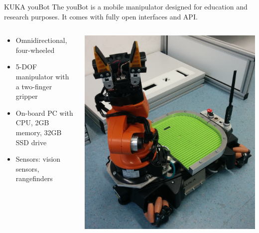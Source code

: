 \begin{frame}{KUKA youBot}
The youBot is a mobile manipulator designed for education and research purposes. It comes with fully open interfaces and API. 
\begin{columns}
    \begin{column}{0.6\textwidth}
        \begin{itemize}
            \item Omnidirectional, four-wheeled
            \item 5-DOF manipulator with a two-finger gripper
            \item On-board PC with CPU, 2GB memory, 32GB SSD drive
            \item Sensors: vision sensors, rangefinders
        \end{itemize} 
    \end{column}
    \begin{column}{0.4\textwidth} %
        \centering
        \includegraphics[width=\linewidth]{gfx/youbot.jpg}
    \end{column}
    
\end{columns}
\end{frame}

